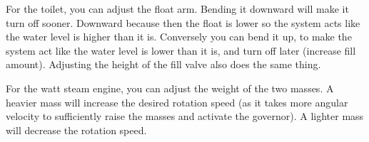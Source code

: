 \documentclass[11pt]{article}
\begin{document}
\soln

For the toilet, you can adjust the float arm.
Bending it downward will make it turn off sooner.
Downward because then the float is lower so the system acts like the water level is higher than it is.
Conversely you can bend it up, to make the system act like the water level is lower than it is, and turn off later (increase fill amount).
Adjusting the height of the fill valve also does the same thing.

For the watt steam engine, you can adjust the weight of the two masses.
A heavier mass will increase the desired rotation speed (as it takes more angular velocity to sufficiently raise the masses and activate the governor).
A lighter mass will decrease the rotation speed.
\end{document}
